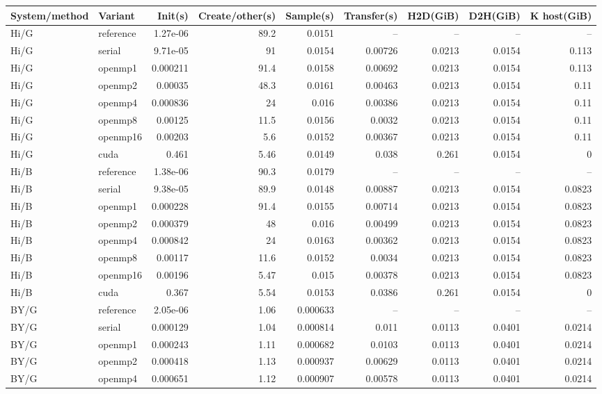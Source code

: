 \documentclass[11pt]{article}
\begin{document}
\scriptsize\begin{longtable}{llrrrrrrr}
\toprule System/method & Variant & Init(s) & Create/other(s) & Sample(s) & Transfer(s) & H2D(GiB) & D2H(GiB) & K host(GiB)\\
\midrule\endhead
Hi/G & reference & 1.27e-06 & 89.2 & 0.0151 & -- & -- & -- & --\\
Hi/G & serial & 9.71e-05 & 91 & 0.0154 & 0.00726 & 0.0213 & 0.0154 & 0.113\\
Hi/G & openmp1 & 0.000211 & 91.4 & 0.0158 & 0.00692 & 0.0213 & 0.0154 & 0.113\\
Hi/G & openmp2 & 0.00035 & 48.3 & 0.0161 & 0.00463 & 0.0213 & 0.0154 & 0.11\\
Hi/G & openmp4 & 0.000836 & 24 & 0.016 & 0.00386 & 0.0213 & 0.0154 & 0.11\\
Hi/G & openmp8 & 0.00125 & 11.5 & 0.0156 & 0.0032 & 0.0213 & 0.0154 & 0.11\\
Hi/G & openmp16 & 0.00203 & 5.6 & 0.0152 & 0.00367 & 0.0213 & 0.0154 & 0.11\\
Hi/G & cuda & 0.461 & 5.46 & 0.0149 & 0.038 & 0.261 & 0.0154 & 0\\
Hi/B & reference & 1.38e-06 & 90.3 & 0.0179 & -- & -- & -- & --\\
Hi/B & serial & 9.38e-05 & 89.9 & 0.0148 & 0.00887 & 0.0213 & 0.0154 & 0.0823\\
Hi/B & openmp1 & 0.000228 & 91.4 & 0.0155 & 0.00714 & 0.0213 & 0.0154 & 0.0823\\
Hi/B & openmp2 & 0.000379 & 48 & 0.016 & 0.00499 & 0.0213 & 0.0154 & 0.0823\\
Hi/B & openmp4 & 0.000842 & 24 & 0.0163 & 0.00362 & 0.0213 & 0.0154 & 0.0823\\
Hi/B & openmp8 & 0.00117 & 11.6 & 0.0152 & 0.0034 & 0.0213 & 0.0154 & 0.0823\\
Hi/B & openmp16 & 0.00196 & 5.47 & 0.015 & 0.00378 & 0.0213 & 0.0154 & 0.0823\\
Hi/B & cuda & 0.367 & 5.54 & 0.0153 & 0.0386 & 0.261 & 0.0154 & 0\\
BY/G & reference & 2.05e-06 & 1.06 & 0.000633 & -- & -- & -- & --\\
BY/G & serial & 0.000129 & 1.04 & 0.000814 & 0.011 & 0.0113 & 0.0401 & 0.0214\\
BY/G & openmp1 & 0.000243 & 1.11 & 0.000682 & 0.0103 & 0.0113 & 0.0401 & 0.0214\\
BY/G & openmp2 & 0.000418 & 1.13 & 0.000937 & 0.00629 & 0.0113 & 0.0401 & 0.0214\\
BY/G & openmp4 & 0.000651 & 1.12 & 0.000907 & 0.00578 & 0.0113 & 0.0401 & 0.0214\\

\end{longtable}
\end{document}
